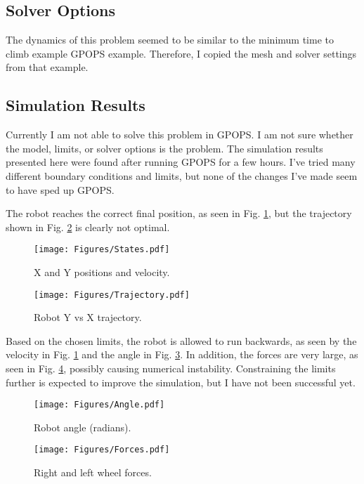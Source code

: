 \documentclass[12pt]{article}
\numberwithin{equation}{section} %
\numberwithin{figure}{section} %
\begin{document}
\subsection{Solver Options}

The dynamics of this problem seemed to be similar to the minimum time to climb example GPOPS example. Therefore, I copied the mesh and solver settings from that example.

\subsection{Simulation Results}
\label{sec:SimResults}

Currently I am not able to solve this problem in GPOPS. I am not sure whether the model, limits, or solver options is the problem. The simulation results presented here were found after running GPOPS for a few hours. I've tried many different boundary conditions and limits, but none of the changes I've made seem to have sped up GPOPS.

The robot reaches the correct final position, as seen in Fig. \ref{fig:States}, but the trajectory shown in Fig. \ref{fig:Trajectory} is clearly not optimal.

\begin{figure}[h!]
	\texttt{[image: Figures/States.pdf]}
	\centering
	\caption{X and Y positions and velocity.}
	\label{fig:States}
\end{figure}

\begin{figure}[h!]
	\texttt{[image: Figures/Trajectory.pdf]}
	\centering
	\caption{Robot Y vs X trajectory.}
	\label{fig:Trajectory}
\end{figure}

Based on the chosen limits, the robot is allowed to run backwards, as seen by the velocity in Fig. \ref{fig:States} and the angle in Fig. \ref{fig:Angle}. In addition, the forces are very large, as seen in Fig. \ref{fig:Forces}, possibly causing numerical instability. Constraining the limits further is expected to improve the simulation, but I have not been successful yet.

\begin{figure}[h!]
	\texttt{[image: Figures/Angle.pdf]}
	\centering
	\caption{Robot angle (radians).}
	\label{fig:Angle}
\end{figure}

\begin{figure}[h!]
	\texttt{[image: Figures/Forces.pdf]}
	\centering
	\caption{Right and left wheel forces.}
	\label{fig:Forces}
\end{figure}

%
%
	
\end{document}
